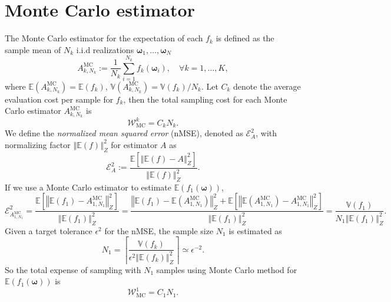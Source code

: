 \documentclass[final,3p,times,11pt]{elsarticle}
\begin{document}
\section{Monte Carlo estimator}
The Monte Carlo estimator for the expectation of each $f_k$ is defined as the sample mean of $N_k$ i.i.d realizations $\boldsymbol{\omega}_1,\ldots,\boldsymbol{\omega}_N$
\begin{equation}\label{eq:MC_estimator}
    A^{\text{MC}}_{k,N_k} := \frac{1}{N_k}\sum_{i=1}^{N_k} f_k(\boldsymbol{\omega}_i),\quad \forall k=1,\ldots, K,
\end{equation}
where $\mathbb{E}(A^{\text{MC}}_{k,N_k}) = \mathbb{E}(f_k)$, $\mathbb{V}(A^{\text{MC}}_{k,N_k}) = \mathbb{V}(f_k)/{N_k}$. Let $C_k$ denote the average evaluation cost per sample for $f_k$, then the total sampling cost for each Monte Carlo estimator $A^{\text{MC}}_{k,N_k}$ is 
\[
\mathcal{W}_\text{MC}^k  = C_kN_k.
\]
We define the \textit{normalized mean squared error}  (nMSE), denoted as $\mathcal{E}_{A}^2$, with normalizing factor $\left\Vert\mathbb{E}(f) \right\Vert_{Z}^2$ for estimator $A$ as
 \[
\mathcal{E}_{A}^2:=\frac{\mathbb E\left[\left\Vert\mathbb{E}(f)-A \right\Vert_{Z}^2\right]}{\left\Vert\mathbb{E}(f) \right\Vert_{Z}^2}.
\] 
If we use a Monte Carlo estimator to estimate $\mathbb{E}\left(f_1(\boldsymbol{\omega})\right)$, 
\[
\mathcal{E}_{A^{\text{MC}}_{1,N_1}}^2=\frac{\mathbb E\left[\left\Vert\mathbb{E}(f_1)-A^{\text{MC}}_{1,N_1} \right\Vert_{Z}^2\right]}{\left\Vert\mathbb{E}(f_1) \right\Vert_{Z}^2} = \frac{\left\Vert\mathbb{E}(f_1)-\mathbb{E}(A^{\text{MC}}_{1,N_1}) \right\Vert_{Z}^2+\mathbb E\left[\left\Vert\mathbb{E}(A^{\text{MC}}_{1,N_1})-A^{\text{MC}}_{1,N_1} \right\Vert_{Z}^2\right]}{\left\Vert\mathbb{E}(f_1) \right\Vert_{Z}^2} = \frac{\mathbb{V}\left(f_1\right)}{N_1\left\Vert\mathbb{E}(f_1) \right\Vert_{Z}^2}.
\]
Given a target tolerance $\epsilon^2$ for the nMSE, the sample size $N_1$ is estimated as 
\[
N_1 = \left\lceil \frac{\mathbb{V}\left(f_k\right)}{\epsilon^2\left\Vert\mathbb{E}(f_k) \right\Vert_{Z}^2}\right\rceil\simeq \epsilon^{-2}.
\]
So the total expense of sampling with $N_1$ samples using Monte Carlo method for $\mathbb{E}\left(f_1(\boldsymbol{\omega})\right)$ is 
\[
\mathcal{W}_\text{MC}^1  = C_1N_1.
\]
\end{document}
